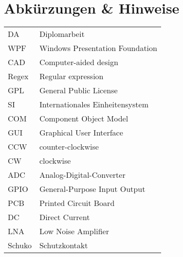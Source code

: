 \section*{Abkürzungen \& Hinweise}
\begin{singlespace}
	\begin{tabular}{ll}
		DA     & Diplomarbeit \\
		WPF    & Windows Presentation Foundation \\
		CAD    & Computer-aided design \\
		Regex  & Regular expression \\
		GPL    & General Public License  \\
		SI     & Internationales Einheitensystem \\
		COM    & Component Object Model \\
		GUI    & Graphical User Interface \\
		CCW	   & counter-clockwise \\
		CW     & clockwise \\
		ADC	   & Analog-Digital-Converter \\
		GPIO   & General-Purpose Input Output \\
		PCB	   & Printed Circuit Board \\
		DC     & Direct Current \\
		LNA    & Low Noise Amplifier \\
		Schuko & Schutzkontakt \\
	\end{tabular}
\end{singlespace}

\pagebreak
